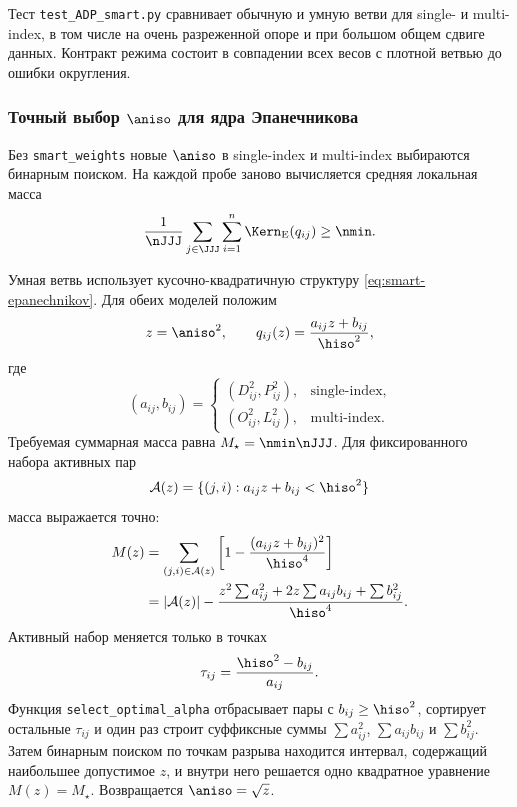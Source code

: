 Тест \texttt{test\_ADP\_smart.py} сравнивает обычную и умную ветви
для single- и multi-index, в том числе на очень разреженной опоре и
при большом общем сдвиге данных. Контракт режима состоит в совпадении
всех весов с плотной ветвью до ошибки округления.

\subsubsection{Точный выбор $\aniso$ для ядра Эпанечникова}

Без \texttt{smart\_weights} новые $\aniso$ в single-index и
multi-index выбираются бинарным поиском. На каждой пробе заново
вычисляется средняя локальная масса
\begin{equation}
    \frac1{\nJJJ}
    \sum_{j\in\JJJ}\sum_{i=1}^n
    \Kern_{\mathrm E}(q_{ij})
    \geq\nmin.
\label{eq:smart-mean-mass}
\end{equation}

Умная ветвь использует кусочно-квадратичную структуру
\eqref{eq:smart-epanechnikov}. Для обеих моделей положим
\begin{equation}
    z=\aniso^2,
    \qquad
    q_{ij}(z)=\frac{a_{ij}z+b_{ij}}{\hiso^2},
\end{equation}
где
\begin{equation}
    (a_{ij},b_{ij})
    =
    \begin{cases}
    (D_{ij}^2,P_{ij}^2), & \text{single-index},\\
    (O_{ij}^2,L_{ij}^2), & \text{multi-index}.
    \end{cases}
\end{equation}
Требуемая суммарная масса равна
$M_{\star}=\nmin\nJJJ$. Для фиксированного набора активных пар
\begin{equation}
    \mathcal A(z)
    =\{(j,i):a_{ij}z+b_{ij}<\hiso^2\}
\end{equation}
масса выражается точно:
\begin{align}
    M(z)
    &=
    \sum_{(j,i)\in\mathcal A(z)}
    \left[1-\frac{(a_{ij}z+b_{ij})^2}{\hiso^4}\right]
    \\
    &=
    |\mathcal A(z)|
    -\frac{
        z^2\sum a_{ij}^2
        +2z\sum a_{ij}b_{ij}
        +\sum b_{ij}^2
    }{\hiso^4}.
\label{eq:smart-piecewise-mass}
\end{align}
Активный набор меняется только в точках
\begin{equation}
    \tau_{ij}=\frac{\hiso^2-b_{ij}}{a_{ij}}.
\label{eq:smart-breakpoints}
\end{equation}
Функция \texttt{select\_optimal\_alpha} отбрасывает пары с
$b_{ij}\geq\hiso^2$, сортирует остальные $\tau_{ij}$ и один раз
строит суффиксные суммы
$\sum a_{ij}^2$, $\sum a_{ij}b_{ij}$ и $\sum b_{ij}^2$.
Затем бинарным поиском по точкам разрыва находится интервал,
содержащий наибольшее допустимое $z$, и внутри него решается одно
квадратное уравнение $M(z)=M_{\star}$. Возвращается
$\aniso=\sqrt z$.

